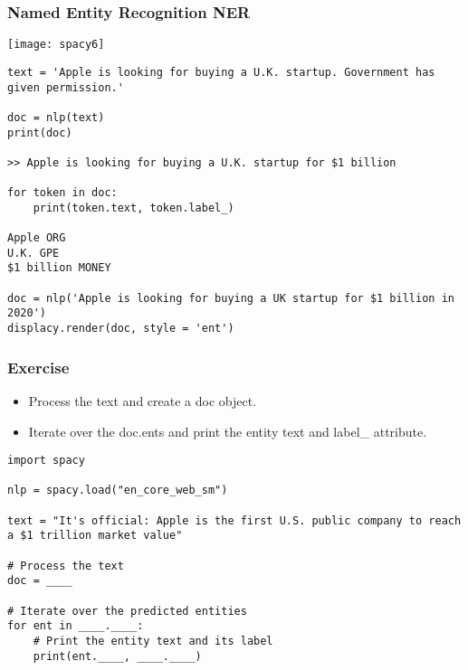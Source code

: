\begin{frame}[fragile]\frametitle{Named Entity Recognition NER}

\begin{center}
\texttt{[image: spacy6]}
\end{center}

\begin{lstlisting}
text = 'Apple is looking for buying a U.K. startup. Government has given permission.'

doc = nlp(text)
print(doc)

>> Apple is looking for buying a U.K. startup for $1 billion

for token in doc:
    print(token.text, token.label_)

Apple ORG
U.K. GPE
$1 billion MONEY

doc = nlp('Apple is looking for buying a UK startup for $1 billion in 2020')
displacy.render(doc, style = 'ent')
\end{lstlisting}



\end{frame}

\begin{frame}[fragile]\frametitle{Exercise}

  \begin{itemize}
    \item Process the text and create a doc object.
    \item Iterate over the doc.ents and print the entity text and label\_ attribute.
  \end{itemize}

  \begin{lstlisting}
import spacy

nlp = spacy.load("en_core_web_sm")

text = "It's official: Apple is the first U.S. public company to reach a $1 trillion market value"

# Process the text
doc = ____

# Iterate over the predicted entities
for ent in ____.____:
    # Print the entity text and its label
    print(ent.____, ____.____)
  \end{lstlisting}
	
\end{frame}

